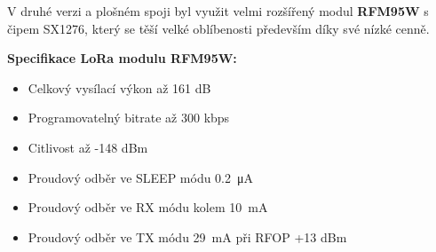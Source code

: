       V druhé verzi a plošném spoji byl využit velmi rozšířený modul \textbf{RFM95W} s čipem SX1276, který se těší velké oblíbenosti především díky své nízké cenně.

    \textbf{Specifikace LoRa modulu RFM95W:}
        \begin{itemize}
            \item Celkový vysílací výkon až 161 dB
            \item Programovatelný bitrate až 300 kbps
            \item Citlivost až -148 dBm
            \item Proudový odběr ve SLEEP módu \SI{0.2}{\micro\ampere} 
            \item Proudový odběr ve RX módu kolem \SI{10}{\milli\ampere} 
            \item Proudový odběr ve TX módu \SI{29}{\milli\ampere} při RFOP +13 dBm
        \end{itemize}

